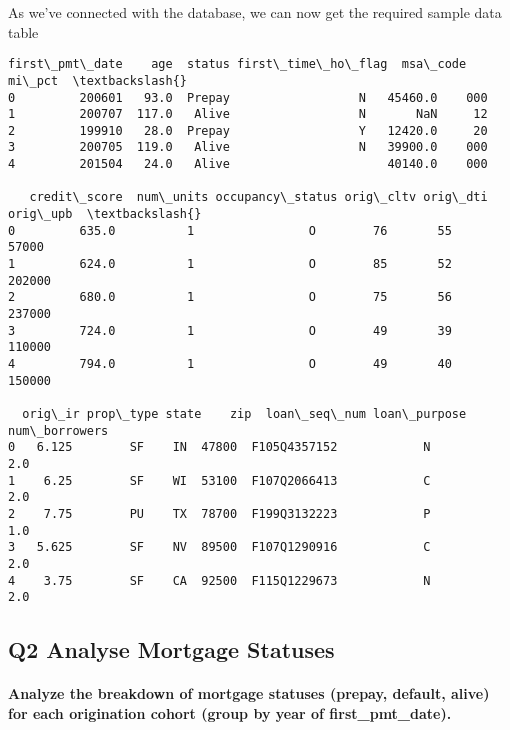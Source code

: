 \documentclass[11pt]{article}
\begin{document}
    As we've connected with the database, we can now get the required sample
data table

            \begin{tcolorbox}[breakable, size=fbox, boxrule=.5pt, pad at break*=1mm, opacityfill=0]
\begin{Verbatim}[commandchars=\\\{\}]
  first\_pmt\_date    age  status first\_time\_ho\_flag  msa\_code mi\_pct  \textbackslash{}
0         200601   93.0  Prepay                  N   45460.0    000
1         200707  117.0   Alive                  N       NaN     12
2         199910   28.0  Prepay                  Y   12420.0     20
3         200705  119.0   Alive                  N   39900.0    000
4         201504   24.0   Alive                      40140.0    000

   credit\_score  num\_units occupancy\_status orig\_cltv orig\_dti orig\_upb  \textbackslash{}
0         635.0          1                O        76       55    57000
1         624.0          1                O        85       52   202000
2         680.0          1                O        75       56   237000
3         724.0          1                O        49       39   110000
4         794.0          1                O        49       40   150000

  orig\_ir prop\_type state    zip  loan\_seq\_num loan\_purpose  num\_borrowers
0   6.125        SF    IN  47800  F105Q4357152            N            2.0
1    6.25        SF    WI  53100  F107Q2066413            C            2.0
2    7.75        PU    TX  78700  F199Q3132223            P            1.0
3   5.625        SF    NV  89500  F107Q1290916            C            2.0
4    3.75        SF    CA  92500  F115Q1229673            N            2.0
\end{Verbatim}
\end{tcolorbox}
        
    \hypertarget{q2-analyse-mortgage-statuses}{%
\subsection{Q2 Analyse Mortgage
Statuses}\label{q2-analyse-mortgage-statuses}}

\hypertarget{analyze-the-breakdown-of-mortgage-statuses-prepay-default-alive-for-each-origination-cohort-group-by-year-of-first_pmt_date.}{%
\paragraph{Analyze the breakdown of mortgage statuses (prepay, default,
alive) for each origination cohort (group by year of
first\_pmt\_date).}\label{analyze-the-breakdown-of-mortgage-statuses-prepay-default-alive-for-each-origination-cohort-group-by-year-of-first_pmt_date.}}
\end{document}
